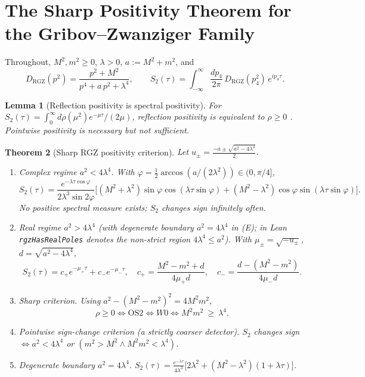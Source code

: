 \documentclass[11pt,a4paper]{article}
\theoremstyle{plain}
\newtheorem{theorem}{Theorem}[section]
\newtheorem{lemma}[theorem]{Lemma}
\theoremstyle{definition}
\theoremstyle{remark}
\newcommand{\OS}{\mathrm{OS}}\newcommand{\Gap}{\mathrm{Gap}}
\renewcommand{\_}{\oldunderscore\allowbreak}
\newcommand{\Lean}[1]{\texttt{\small #1}}
\begin{document}
\section{The Sharp Positivity Theorem for the Gribov--Zwanziger Family}\label{sec:rgz}
Throughout, $M^2,m^2\ge0$, $\lambda>0$, $a:=M^2+m^2$, and
\[
D_{\mathrm{RGZ}}(p^2)=\frac{p^2+M^2}{p^4+a\,p^2+\lambda^4},\qquad
S_2(\tau)=\int_{-\infty}^{\infty}\frac{dp_4}{2\pi}\,D_{\mathrm{RGZ}}(p_4^2)\,e^{ip_4\tau}.
\]
\begin{lemma}[Reflection positivity is spectral positivity]\label{lem:rp}
For $S_2(\tau)=\int_0^\infty d\rho(\mu^2)e^{-\mu\tau}/(2\mu)$, reflection positivity is equivalent
to $\rho\ge0$ \cite{Usui2012,KL}. Pointwise positivity is necessary but not sufficient.
\end{lemma}
\begin{theorem}[Sharp RGZ positivity criterion]\label{thm:rgz}
Let $u_\pm=\tfrac{-a\pm\sqrt{a^2-4\lambda^4}}2$.
\begin{enumerate}[label=(\Alph*),leftmargin=24pt,itemsep=2pt]
\item \emph{Complex regime $a^2<4\lambda^4$.} With
$\varphi=\tfrac12\arccos(a/(2\lambda^2))\in(0,\pi/4]$,
\[
S_2(\tau)=\frac{e^{-\lambda\tau\cos\varphi}}{2\lambda^3\sin2\varphi}
\Big[(M^2+\lambda^2)\sin\varphi\cos(\lambda\tau\sin\varphi)
+(M^2-\lambda^2)\cos\varphi\sin(\lambda\tau\sin\varphi)\Big].
\]
No positive spectral measure exists; $S_2$ changes sign infinitely often.
\item \emph{Real regime $a^2>4\lambda^4$ (with degenerate boundary $a^2=4\lambda^4$ in (E); in Lean \Lean{rgzHasRealPoles} denotes the non-strict region $4\lambda^4\le a^2$).} With $\mu_\pm=\sqrt{-u_\pm}$,
$d=\sqrt{a^2-4\lambda^4}$,
\[
S_2(\tau)=c_+e^{-\mu_+\tau}+c_-e^{-\mu_-\tau},\quad
c_+=\frac{M^2-m^2+d}{4\mu_+d},\quad c_-=\frac{d-(M^2-m^2)}{4\mu_-d}.
\]
\item \emph{Sharp criterion.} Using $a^2-(M^2-m^2)^2=4M^2m^2$,
\[
\boxed{\ \rho\ge0\iff \OS2\iff W0\iff M^2m^2\ \ge\ \lambda^4.\ }
\]
\item \emph{Pointwise sign-change criterion (a strictly coarser detector).}
$S_2$ changes sign $\iff a^2<4\lambda^4$ or $(m^2>M^2\wedge M^2m^2<\lambda^4)$.
\item \emph{Degenerate boundary $a^2=4\lambda^4$.}
$S_2(\tau)=\frac{e^{-\lambda\tau}}{4\lambda^3}\big[2\lambda^2+(M^2-\lambda^2)(1+\lambda\tau)\big]$.
\end{enumerate}
\end{theorem}
\end{document}
